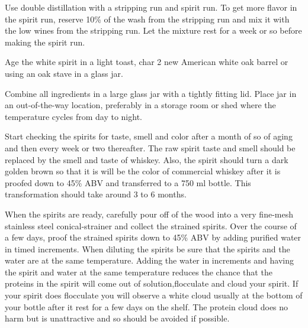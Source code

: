 \documentclass[letterpaper]{recipePMG}
\begin{document}
\newpage
{}


Use double distillation with a stripping run and spirit run. To get more flavor in the spirit run, reserve 10\% of the wash from the stripping run and  mix it with the low wines from the stripping run. Let the mixture rest for a week or so before making the spirit run.

Age the white spirit in a light toast, char 2 new American white oak barrel or using an oak stave in a glass jar.


\newpage



Combine all ingredients in a large glass jar with a tightly fitting lid. Place jar in an out-of-the-way location, preferably in a storage room or shed where the temperature cycles from day to night.

Start checking the spirits for taste, smell and color after a month of so of aging and then every week or two thereafter. The raw spirit taste and smell should be replaced by the smell and taste of whiskey.  Also, the spirit should turn a dark golden brown so that it is will be the color of commercial whiskey after it is proofed down to 45\% ABV and transferred to a 750 ml bottle. This transformation should take around 3 to 6 months.

When the spirits are ready, carefully pour off of the wood into a very fine-mesh stainless steel conical-strainer and collect the strained spirits. Over the course of a few days, proof the strained spirits down to 45\% ABV by adding purified water in timed increments. When diluting the spirits be sure that the spirits and the water are at the same temperature. Adding the water in increments and having the spirit and water  at the same temperature reduces the chance that the proteins in the spirit will come out of solution,flocculate and cloud your spirit. If your spirit does flocculate you will observe a white cloud usually at the bottom of your bottle after it rest for a few days on the shelf. The protein cloud does no harm but is unattractive and so should be avoided if possible. 
\end{document}
